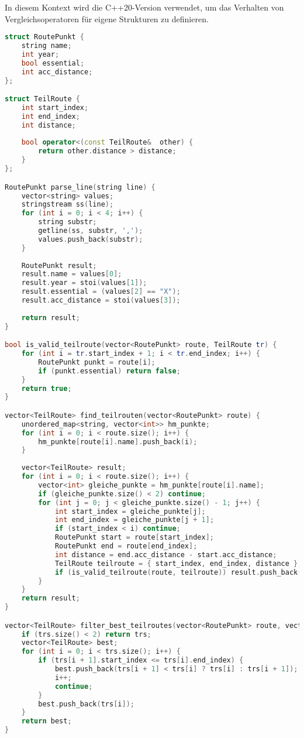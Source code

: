 \documentclass[a4paper,10pt,ngerman]{scrartcl}
\begin{document}
In diesem Kontext wird die C++20-Version verwendet, um das Verhalten von Vergleichsoperatoren für eigene Strukturen zu definieren.

\begin{lstlisting}[language=C++]
struct RoutePunkt {
    string name;
    int year;
    bool essential;
    int acc_distance;
};

struct TeilRoute {
    int start_index;
    int end_index;
    int distance;
    
    bool operator<(const TeilRoute&  other) {
        return other.distance > distance;
    }
};

RoutePunkt parse_line(string line) {
    vector<string> values;
    stringstream ss(line);
    for (int i = 0; i < 4; i++) {
        string substr;
        getline(ss, substr, ',');
        values.push_back(substr);
    }
    
    RoutePunkt result;
    result.name = values[0];
    result.year = stoi(values[1]);
    result.essential = (values[2] == "X");
    result.acc_distance = stoi(values[3]);
    
    return result;
}

bool is_valid_teilroute(vector<RoutePunkt> route, TeilRoute tr) {
    for (int i = tr.start_index + 1; i < tr.end_index; i++) {
        RoutePunkt punkt = route[i];
        if (punkt.essential) return false;
    }
    return true;
}

vector<TeilRoute> find_teilrouten(vector<RoutePunkt> route) {
    unordered_map<string, vector<int>> hm_punkte;
    for (int i = 0; i < route.size(); i++) {
        hm_punkte[route[i].name].push_back(i);
    }
    
    vector<TeilRoute> result;
    for (int i = 0; i < route.size(); i++) {
        vector<int> gleiche_punkte = hm_punkte[route[i].name];
        if (gleiche_punkte.size() < 2) continue;
        for (int j = 0; j < gleiche_punkte.size() - 1; j++) {
            int start_index = gleiche_punkte[j];
            int end_index = gleiche_punkte[j + 1];
            if (start_index < i) continue;
            RoutePunkt start = route[start_index];
            RoutePunkt end = route[end_index];
            int distance = end.acc_distance - start.acc_distance;
            TeilRoute teilroute = { start_index, end_index, distance };
            if (is_valid_teilroute(route, teilroute)) result.push_back(teilroute);
        }
    }
    return result;
}

vector<TeilRoute> filter_best_teilroutes(vector<RoutePunkt> route, vector<TeilRoute> trs) {
    if (trs.size() < 2) return trs;
    vector<TeilRoute> best;
    for (int i = 0; i < trs.size(); i++) {
        if (trs[i + 1].start_index <= trs[i].end_index) {
            best.push_back(trs[i + 1] < trs[i] ? trs[i] : trs[i + 1]);
            i++;
            continue;
        }
        best.push_back(trs[i]);
    }
    return best;
}


\end{lstlisting}
\end{document}
